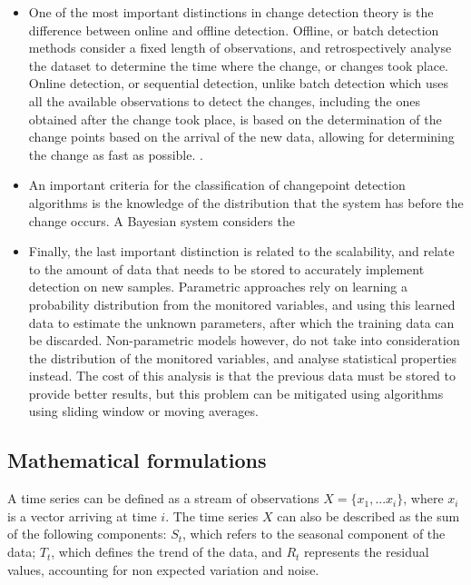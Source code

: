 \begin {itemize}
    \item One of the most important distinctions in change detection theory is the difference between online and offline detection. Offline, or batch detection methods consider a fixed length of observations, and retrospectively 
analyse the dataset to determine the time where the change, or changes took place. Online detection, or sequential detection, unlike batch detection which uses all the available observations to detect the changes, including the
ones obtained after the change took place, is based on the determination of the change points based on the arrival of the new data, allowing for determining the change as fast as possible.
\cite { CITE - http://citeseerx.ist.psu.edu/viewdoc/download?doi=10.1.1.425.1477&rep=rep1&type=pdf}. 
    \item An important criteria for the classification of changepoint detection algorithms is the knowledge of the distribution that the system has before the change occurs. A Bayesian system considers the 
    \item Finally, the last important distinction is related to the scalability, and relate to the amount of data that needs to be stored to accurately implement detection on new samples. Parametric approaches rely on learning a 
probability distribution from the monitored variables, and using this learned data to estimate the unknown parameters, after which the training data can be discarded. Non-parametric models however, do not take into consideration the
distribution of the monitored variables, and analyse statistical properties instead. The cost of this analysis is that the previous data must be stored to provide better results, but this problem can be mitigated using 
algorithms using sliding window or moving averages.
\end {itemize}

\subsection {Mathematical formulations}

A time series can be defined as a stream of observations $X = \{x_1, ... x_i\}$, where $x_i$ is a vector arriving at time $i$. The time series $X$ can also be described as the sum of the following components: $S_t$,
which refers to the seasonal component of the data; $T_t$, which defines the trend of the data, and $R_t$ represents the residual values, accounting for non expected variation and noise.

